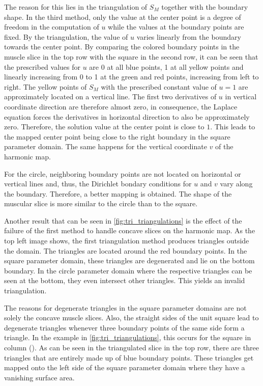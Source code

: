 The reason for this lies in the triangulation of $S_M$ together with the boundary shape. In the third method, only the value at the center point is a degree of freedom in the computation of $u$ while the values at the boundary points are fixed. By the triangulation, the value of $u$ varies linearly from the boundary towards the center point.
By comparing the colored boundary points in the muscle slice in the top row with the square in the second row, it can be seen that the prescribed values for $u$ are 0 at all blue points, 1 at all yellow points and linearly increasing from 0 to 1 at the green and red points, increasing from left to right.
The yellow points of $S_M$ with the prescribed constant value of $u=1$ are approximately located on a vertical line. The first two derivatives of $u$ in vertical coordinate direction are therefore almost zero, in consequence, the Laplace equation forces the derivatives in horizontal direction to also be approximately zero. Therefore, the solution value at the center point is close to $1$. This leads to the mapped center point being close to the right boundary in the square parameter domain. The same happens for the vertical coordinate $v$ of the harmonic map.

For the circle, neighboring boundary points are not located on horizontal or vertical lines and, thus, the Dirichlet bondary conditions for $u$ and $v$ vary along the boundary. Therefore, a better mapping is obtained. The shape of the muscular slice is more similar to the circle than to the square.

Another result that can be seen in \cref{fig:tri_triangulations} is the effect of the failure of the first method to handle concave slices on the harmonic map. As the top left image shows, the first triangulation method produces triangles outside the domain. The triangles are located around the red boundary points. In the square parameter domain, these triangles are degenerated and lie on the bottom boundary. In the circle parameter domain where the respective triangles can be seen at the bottom, they even intersect other triangles. This yields an invalid triangulation.

The reasons for degenerate triangles in the square parameter domains are not solely the concave muscle slices. Also, the straight sides of the unit square lead to degenerate triangles whenever three boundary points of the same side form a triangle.
In the example in \cref{fig:tri_triangulations}, this occurs for the square in column (). As can be seen in the triangulated slice in the top row, there are three triangles that are entirely made up of blue boundary points. These triangles get mapped onto the left side of the square parameter domain where they have a vanishing surface area.

